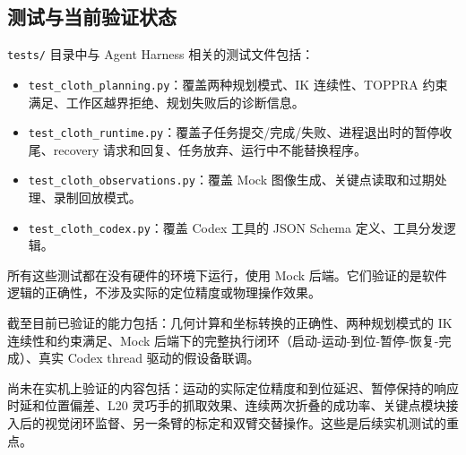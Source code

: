 \subsection{测试与当前验证状态}
\label{subsec:agent-tests}

\texttt{tests/} 目录中与 Agent Harness 相关的测试文件包括：

\begin{itemize}
  \item \texttt{test\_cloth\_planning.py}：覆盖两种规划模式、IK 连续性、TOPPRA 约束满足、工作区越界拒绝、规划失败后的诊断信息。
  \item \texttt{test\_cloth\_runtime.py}：覆盖子任务提交/完成/失败、进程退出时的暂停收尾、recovery 请求和回复、任务放弃、运行中不能替换程序。
  \item \texttt{test\_cloth\_observations.py}：覆盖 Mock 图像生成、关键点读取和过期处理、录制回放模式。
  \item \texttt{test\_cloth\_codex.py}：覆盖 Codex 工具的 JSON Schema 定义、工具分发逻辑。
\end{itemize}

所有这些测试都在没有硬件的环境下运行，使用 Mock 后端。它们验证的是软件逻辑的正确性，不涉及实际的定位精度或物理操作效果。

截至目前已验证的能力包括：几何计算和坐标转换的正确性、两种规划模式的 IK 连续性和约束满足、Mock 后端下的完整执行闭环（启动-运动-到位-暂停-恢复-完成）、真实 Codex thread 驱动的假设备联调。

尚未在实机上验证的内容包括：运动的实际定位精度和到位延迟、暂停保持的响应时延和位置偏差、L20 灵巧手的抓取效果、连续两次折叠的成功率、关键点模块接入后的视觉闭环监督、另一条臂的标定和双臂交替操作。这些是后续实机测试的重点。


